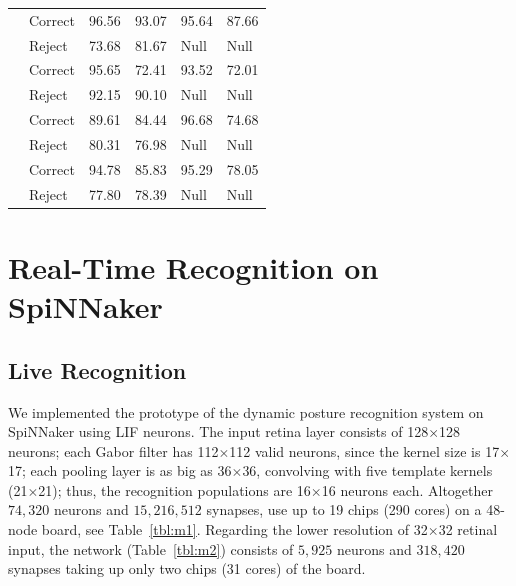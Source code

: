 \begin{table}[ph!]
\begin{tabular}{p{}|p{}<{\centering}|p{}<{\centering}|p{}<{\centering}|p{}<{\centering}|p{}<{\centering}}
			& Correct & 96.56	& 93.07	& 95.64	& 87.66
			\\ 
			& Reject & 73.68	& 81.67 	& Null	& Null
			\\ \hline
			& Correct & 95.65	& 72.41	& 93.52	& 72.01
			\\ 
			& Reject & 92.15	& 90.10 	& Null	& Null
			\\ \hline
			& Correct & 89.61	& 84.44	& 96.68	& 74.68
			\\ 
			& Reject & 80.31	& 76.98 	& Null	& Null
			\\ \hline\hline
			& Correct & 94.78	& 85.83	& 95.29	& 78.05
			\\ 
			& Reject & 77.80	& 78.39 	& Null	& Null
			\\ \hline
	\end{tabular}
	\label{tbl:rsl}
\end{table}

\section{Real-Time Recognition on SpiNNaker}
\subsection{Live Recognition}
We implemented the prototype of the dynamic posture recognition system on SpiNNaker using LIF neurons. 
The input retina layer consists of 128$\times$128 neurons; 
each Gabor filter has 112$\times$112 valid neurons, since the kernel size is 17$\times$17; 
each pooling layer is as big as 36$\times$36, convolving with five template kernels (21$\times$21); 
thus, the recognition populations are 16$\times$16 neurons each. Altogether $74,320$ neurons and $15,216,512$ synapses, use up to 19 chips (290 cores) on a 48-node board, see Table~\ref{tbl:m1}. Regarding the lower resolution of 32$\times$32 retinal input, the network (Table~\ref{tbl:m2}) consists of $5,925$ neurons and $318,420$ synapses taking up only two chips (31 cores) of the board.

